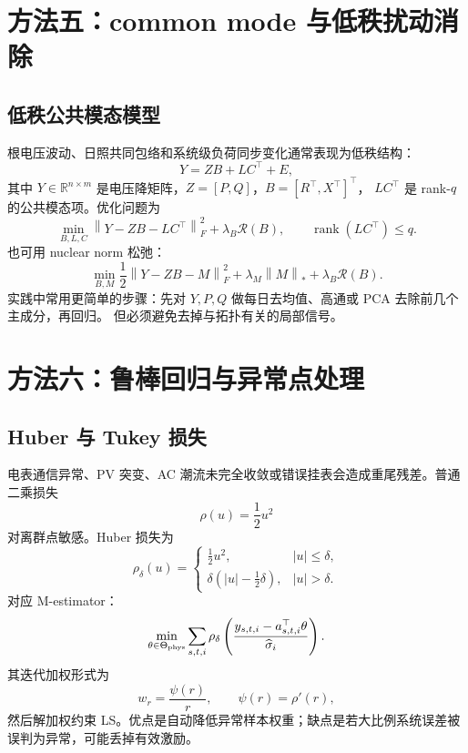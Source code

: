 \documentclass[UTF8,11pt]{ctexart}
\newcommand{\R}{\mathbb{R}}
\newcommand{\norm}[1]{\left\lVert #1 \right\rVert}
\begin{document}
\section{方法五：common mode 与低秩扰动消除}

\subsection{低秩公共模态模型}

根电压波动、日照共同包络和系统级负荷同步变化通常表现为低秩结构：
\[
    Y = ZB + LC^\top + E,
    \label{eq:lowrank}
\]
其中 $Y\in\R^{n\times m}$ 是电压降矩阵，$Z=[P,Q]$，$B=[R^\top,X^\top]^\top$，
$LC^\top$ 是 rank-$q$ 的公共模态项。优化问题为
\begin{equation}
    \min_{B,L,C}
    \norm{Y-ZB-LC^\top}_F^2
    +\lambda_B\mathcal{R}(B),
    \qquad \operatorname{rank}(LC^\top)\le q.
    \label{eq:lowrank-regression}
\end{equation}
也可用 nuclear norm 松弛：
\begin{equation}
    \min_{B,M}
    \frac12\norm{Y-ZB-M}_F^2+\lambda_M\norm{M}_\ast+\lambda_B\mathcal{R}(B).
    \label{eq:nuclear}
\end{equation}
实践中常用更简单的步骤：先对 $Y,P,Q$ 做每日去均值、高通或 PCA 去除前几个主成分，再回归。
但必须避免去掉与拓扑有关的局部信号。

\section{方法六：鲁棒回归与异常点处理}

\subsection{Huber 与 Tukey 损失}

电表通信异常、PV 突变、AC 潮流未完全收敛或错误挂表会造成重尾残差。普通二乘损失
\[
    \rho(u)=\frac12u^2
\]
对离群点敏感。Huber 损失为
\begin{equation}
    \rho_\delta(u)=
    \begin{cases}
      \frac12u^2, & |u|\le\delta,\\
      \delta(|u|-\frac12\delta), & |u|>\delta.
    \end{cases}
    \label{eq:huber}
\end{equation}
对应 M-estimator：
\begin{equation}
    \min_{\theta\in\Theta_{\rm phys}}
    \sum_{s,t,i}\rho_\delta
    \left(
      \frac{y_{s,t,i}-a_{s,t,i}^\top\theta}{\widehat\sigma_i}
    \right).
    \label{eq:m-estimator}
\end{equation}
其迭代加权形式为
\[
    w_r=\frac{\psi(r)}{r},\qquad
    \psi(r)=\rho'(r),
\]
然后解加权约束 LS。优点是自动降低异常样本权重；缺点是若大比例系统误差被误判为异常，可能丢掉有效激励。
\end{document}
